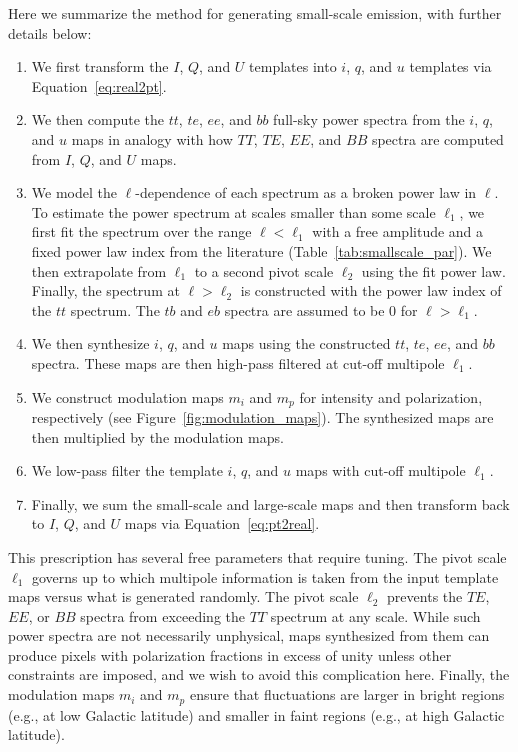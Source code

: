 \documentclass[twocolumn]{aastex631}
\begin{document}
Here we summarize the method for generating small-scale emission, with further details below: 
\begin{enumerate}
    \item We first transform the $I$, $Q$, and $U$ templates into $i$, $q$, and $u$ templates via Equation~\eqref{eq:real2pt}.
    \item We then compute the $tt$, $te$, $ee$, and $bb$ full-sky power spectra from the $i$, $q$, and $u$ maps in analogy with how $TT$, $TE$, $EE$, and $BB$ spectra are computed from $I$, $Q$, and $U$ maps.
    \item We model the $\ell$-dependence of each spectrum as a broken power law in $\ell$. To estimate the power spectrum at scales smaller than some scale $\ell_1$, we first fit the spectrum over the range $\ell < \ell_1$ with a free amplitude and a fixed power law index from the literature (Table~\ref{tab:smallscale_par}). We then extrapolate from $\ell_1$ to a second pivot scale $\ell_2$ using the fit power law. Finally, the spectrum at $\ell > \ell_2$ is constructed with the power law index of the $tt$ spectrum. The $tb$ and $eb$ spectra are assumed to be 0 for $\ell > \ell_1$.
    \item  We then synthesize $i$, $q$, and $u$ maps using the constructed $tt$, $te$, $ee$, and $bb$ spectra. These maps are then high-pass filtered at cut-off multipole $\ell_1$.
    \item We construct modulation maps $m_i$ and $m_p$ for intensity and polarization, respectively (see Figure~\ref{fig:modulation_maps}). The synthesized maps are then multiplied by the modulation maps.
    \item We low-pass filter the template $i$, $q$, and $u$ maps with cut-off multipole $\ell_1$.
    \item Finally, we sum the small-scale and large-scale maps and then transform back to $I$, $Q$, and $U$ maps via Equation~\eqref{eq:pt2real}.
\end{enumerate}

This prescription has several free parameters that require tuning. The pivot scale $\ell_1$ governs up to which multipole information is taken from the input template maps versus what is generated randomly. The pivot scale $\ell_2$ prevents the $TE$, $EE$, or $BB$ spectra from exceeding the $TT$ spectrum at any scale. While such power spectra are not necessarily unphysical, maps synthesized from them can produce pixels with polarization fractions in excess of unity unless other constraints are imposed, and we wish to avoid this complication here. Finally, the modulation maps $m_i$ and $m_p$ ensure that fluctuations are larger in bright regions (e.g., at low Galactic latitude) and smaller in faint regions (e.g., at high Galactic latitude).
\end{document}
